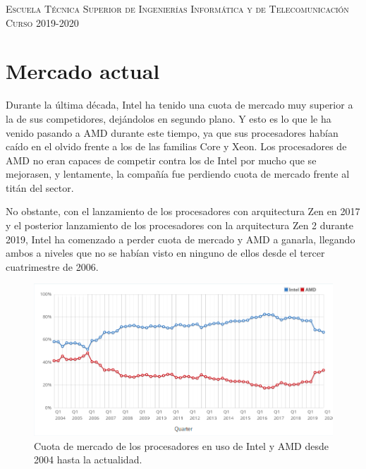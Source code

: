 \documentclass[11pt,a4paper]{article}
\begin{document}
\begin{titlepage}
\begin{minipage}{\textwidth}
\vspace{0.7cm}
\textsc{Escuela Técnica Superior de Ingenierías Informática y de Telecomunicación}\\
\vspace{1cm}
\textsc{Curso 2019-2020}
\end{minipage}
\end{titlepage}

\tableofcontents
\thispagestyle{empty}				%

\newpage

\setlength{\parskip}{1em}

\section*{Mercado actual}

Durante la última década, Intel ha tenido una cuota de mercado muy superior a la de sus
competidores, dejándolos en segundo plano. Y esto es lo que le ha venido pasando a AMD durante
este tiempo, ya que sus procesadores habían caído en el olvido frente a los de las familias Core y
Xeon. Los procesadores de AMD no eran capaces de competir contra los de Intel por mucho que se
mejorasen, y lentamente, la compañía fue perdiendo cuota de mercado frente al titán del sector.

No obstante, con el lanzamiento de los procesadores con arquitectura Zen en 2017 y el posterior
lanzamiento de los procesadores con la arquitectura Zen 2 durante 2019, Intel ha comenzado a
perder cuota de mercado y AMD a ganarla, llegando ambos a niveles que no se habían visto en
ninguno de ellos desde el tercer cuatrimestre de 2006.

\begin{figure}[H]
  \centering
  \includegraphics[scale=0.6]{img/cuota-mercado-intel-amd}
  \caption{Cuota de mercado de los procesadores en uso de Intel y AMD desde 2004 hasta la
  actualidad.}
\end{figure}
\end{document}
